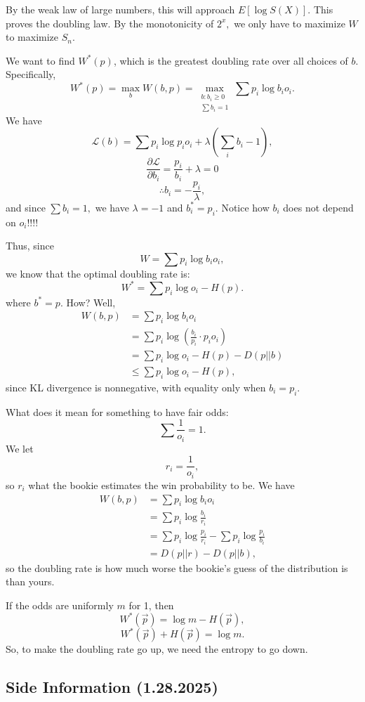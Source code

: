 \documentclass[12pt]{article}
\theoremstyle{remark}
\begin{document}
By the weak law of large numbers, this will approach $E[\log S(X)].$ This proves the doubling law. By the monotonicity of $2^x,$ we only have to maximize $W$ to maximize $S_n.$

We want to find $W^\ast(p)$, which is the greatest doubling rate over all choices of $b.$ Specifically,
\[W^\ast(p)=\max_b W(b,p)=\max_{\substack{b:b_i\ge 0\\\sum b_i=1}}\sum p_i
\log b_io_i.\]
We have 
\[\mathcal{L}(b)=\sum p_i\log p_io_i + \lambda\left(\sum_i b_i-1\right),\]
\[\frac{\partial\mathcal{L}}{\partial b_i}=\frac{p_i}{b_i}+\lambda = 0\]
\[\therefore b_i=-\frac{p_i}{\lambda},\] and since $\sum b_i=1,$ we have $\lambda=-1$ and $b_i^\ast=p_i.$ Notice how $b_i$ does not depend on $o_i!!!!$

Thus, since
\[W= \sum p_i\log b_io_i,\]
we know that the optimal doubling rate is:
\[W^\ast=\sum p_i\log o_i-H(p).\] where $b^\ast=p.$
How? Well,
\begin{align*}W(b,p)&=\sum p_i\log b_io_i\\&=\sum p_i\log\left(\frac{b_i}{p_i}\cdot p_io_i\right)\\&=\sum p_i\log o_i-H(p) - D(p||b)\\&\le\sum p_i\log o_i-H(p),\end{align*}
since KL divergence is nonnegative, with equality only when $b_i=p_i.$





What does it mean for something to have fair odds:
\[\sum\frac{1}{o_i}=1.\] We let
\[r_i=\frac{1}{o_i},\] so $r_i$ what the bookie estimates the win probability to be.
We have
\begin{align*}W(b,p)&=\sum p_i\log b_i o_i\\&=\sum p_i\log\frac{b_i}{r_i}\\&=\sum p_i\log\frac{p_i}{r_i}-\sum p_i\log\frac{p_i}{b_i}\\
&=D(p||r)-D(p||b),\end{align*} so the doubling rate is how much worse the bookie's guess of the distribution is than yours.

If the odds are uniformly $m$ for 1, then
\[W^\ast(\vec p)=\log m-H(\vec p),\]
\[W^\ast(\vec p)+H(\vec p)=\log m.\] So, to make the doubling rate go up, we need the entropy to go down.

\subsection{Side Information (1.28.2025)}
\end{document}
